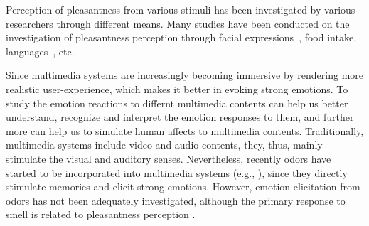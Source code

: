 %




Perception of pleasantness from various stimuli has been investigated by various researchers through different means. Many studies have been conducted on the investigation of pleasantness perception through facial expressions~\cite{lyons1998coding}, food intake\cite{de2003taste}, languages~\cite{bellezza1986words}, etc.


Since multimedia systems are increasingly becoming immersive by rendering more realistic user-experience, which makes it better in evoking strong emotions. To study the emotion reactions to differnt multimedia contents can help us better understand, recognize and interpret the emotion responses to them, and further more can help us to simulate human affects to multimedia contents. Traditionally, multimedia systems include video and audio contents, they, thus, mainly stimulate the visual and auditory senses. Nevertheless, recently odors have started to be incorporated into multimedia systems (e.g., \cite{nakamoto2011olfactory,nakamoto2008cooking,richard2006multi}), since they directly stimulate memories and elicit strong emotions. However, emotion elicitation from odors has not been adequately investigated, although the primary response to smell is related to pleasantness perception \cite{gulas1995right}. 


